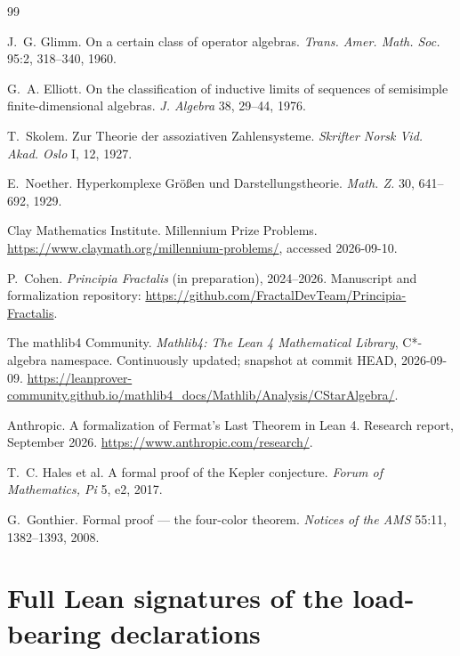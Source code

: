 \documentclass[11pt,a4paper]{article}
\theoremstyle{plain}
\theoremstyle{definition}
\begin{document}
\begin{thebibliography}{99}

J.~G. Glimm.
\newblock On a certain class of operator algebras.
\newblock \emph{Trans. Amer. Math. Soc.} 95:2, 318--340, 1960.

G.~A. Elliott.
\newblock On the classification of inductive limits of sequences of semisimple finite-dimensional algebras.
\newblock \emph{J. Algebra} 38, 29--44, 1976.

T.~Skolem.
\newblock Zur Theorie der assoziativen Zahlensysteme.
\newblock \emph{Skrifter Norsk Vid. Akad. Oslo} I, 12, 1927.

E.~Noether.
\newblock Hyperkomplexe Gr\"o\ss{}en und Darstellungstheorie.
\newblock \emph{Math. Z.} 30, 641--692, 1929.

Clay Mathematics Institute.
\newblock Millennium Prize Problems.
\newblock \url{https://www.claymath.org/millennium-problems/}, accessed 2026-09-10.

P.~Cohen.
\newblock \emph{Principia Fractalis} (in preparation), 2024--2026.
\newblock Manuscript and formalization repository: \url{https://github.com/FractalDevTeam/Principia-Fractalis}.

The mathlib4 Community.
\newblock \emph{Mathlib4: The Lean 4 Mathematical Library}, C*-algebra namespace.
\newblock Continuously updated; snapshot at commit HEAD, 2026-09-09.
\newblock \url{https://leanprover-community.github.io/mathlib4_docs/Mathlib/Analysis/CStarAlgebra/}.

Anthropic.
\newblock A formalization of Fermat's Last Theorem in Lean 4.
\newblock Research report, September 2026.
\newblock \url{https://www.anthropic.com/research/}.

T.~C. Hales et al.
\newblock A formal proof of the Kepler conjecture.
\newblock \emph{Forum of Mathematics, Pi} 5, e2, 2017.

G.~Gonthier.
\newblock Formal proof --- the four-color theorem.
\newblock \emph{Notices of the AMS} 55:11, 1382--1393, 2008.

\end{thebibliography}

\appendix

\section{Full Lean signatures of the load-bearing declarations}
\label{app:signatures}
\end{document}
